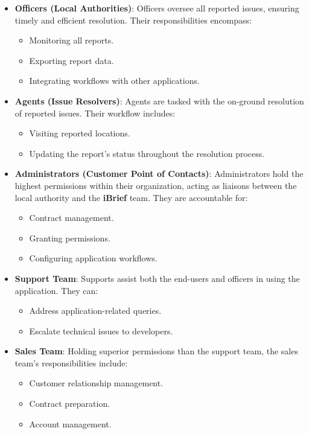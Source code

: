 \begin{itemize}
    \item \textbf{Officers (Local Authorities)}: Officers oversee all reported issues, ensuring timely and efficient resolution. Their responsibilities encompass:
        \begin{itemize}
            \item Monitoring all reports.
            \item Exporting report data.
            \item Integrating workflows with other applications.
        \end{itemize}

    \item \textbf{Agents (Issue Resolvers)}: Agents are tasked with the on-ground resolution of reported issues. Their workflow includes:
        \begin{itemize}
            \item Visiting reported locations.
            \item Updating the report's status throughout the resolution process.
        \end{itemize}

    \item \textbf{Administrators (Customer Point of Contacts)}: Administrators hold the highest permissions within their organization, acting as liaisons between the local authority and the \textbf{iBrief} team. They are accountable for:
        \begin{itemize}
            \item Contract management.
            \item Granting permissions.
            \item Configuring application workflows.
        \end{itemize}

    \item \textbf{Support Team}: Supports assist both the end-users and officers in using the application. They can:
        \begin{itemize}
            \item Address application-related queries.
            \item Escalate technical issues to developers.
        \end{itemize}

    \item \textbf{Sales Team}: Holding superior permissions than the support team, the sales team's responsibilities include:
        \begin{itemize}
            \item Customer relationship management.
            \item Contract preparation.
            \item Account management.
        \end{itemize}


\end{itemize}
